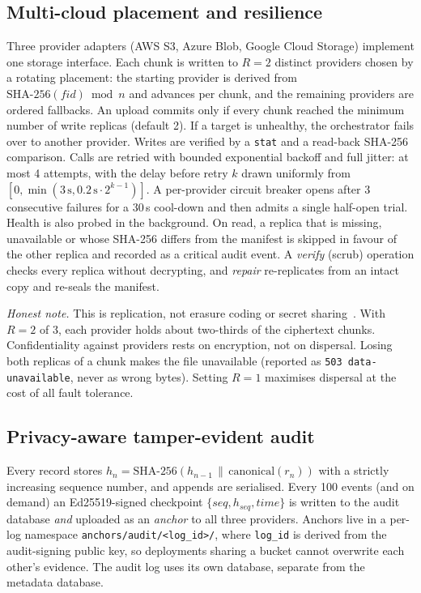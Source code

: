 \documentclass[conference]{IEEEtran}
\newcommand{\code}[1]{\texttt{\small #1}}
\begin{document}
\subsection{Multi-cloud placement and resilience}\label{sec:placement}
Three provider adapters (AWS S3, Azure Blob, Google Cloud Storage) implement one storage interface. Each chunk is written to $R=2$ distinct providers chosen by a rotating placement: the starting provider is derived from $\mathrm{SHA\text{-}256}(\mathit{fid}) \bmod n$ and advances per chunk, and the remaining providers are ordered fallbacks. An upload commits only if every chunk reached the minimum number of write replicas (default 2). If a target is unhealthy, the orchestrator fails over to another provider. Writes are verified by a \code{stat} and a read-back SHA-256 comparison. Calls are retried with bounded exponential backoff and full jitter: at most 4 attempts, with the delay before retry $k$ drawn uniformly from $[0,\min(3\,\mathrm{s}, 0.2\,\mathrm{s}\cdot 2^{k-1})]$. A per-provider circuit breaker opens after 3 consecutive failures for a 30\,s cool-down and then admits a single half-open trial. Health is also probed in the background. On read, a replica that is missing, unavailable or whose SHA-256 differs from the manifest is skipped in favour of the other replica and recorded as a critical audit event. A \emph{verify} (scrub) operation checks every replica without decrypting, and \emph{repair} re-replicates from an intact copy and re-seals the manifest.

\emph{Honest note.} This is replication, not erasure coding or secret sharing~\cite{rabin1989,shamir1979,bessani2011depsky}. With $R=2$ of 3, each provider holds about two-thirds of the ciphertext chunks. Confidentiality against providers rests on encryption, not on dispersal. Losing both replicas of a chunk makes the file unavailable (reported as \code{503 data-unavailable}, never as wrong bytes). Setting $R=1$ maximises dispersal at the cost of all fault tolerance.

\subsection{Privacy-aware tamper-evident audit}
Every record stores $h_n = \mathrm{SHA\text{-}256}(h_{n-1}\,\|\,\mathrm{canonical}(r_n))$ with a strictly increasing sequence number, and appends are serialised. Every 100 events (and on demand) an Ed25519-signed checkpoint $\{\mathit{seq}, h_{\mathit{seq}}, \mathit{time}\}$ is written to the audit database \emph{and} uploaded as an \emph{anchor} to all three providers. Anchors live in a per-log namespace \code{anchors/audit/<log\_id>/}, where \code{log\_id} is derived from the audit-signing public key, so deployments sharing a bucket cannot overwrite each other's evidence. The audit log uses its own database, separate from the metadata database.
\end{document}
